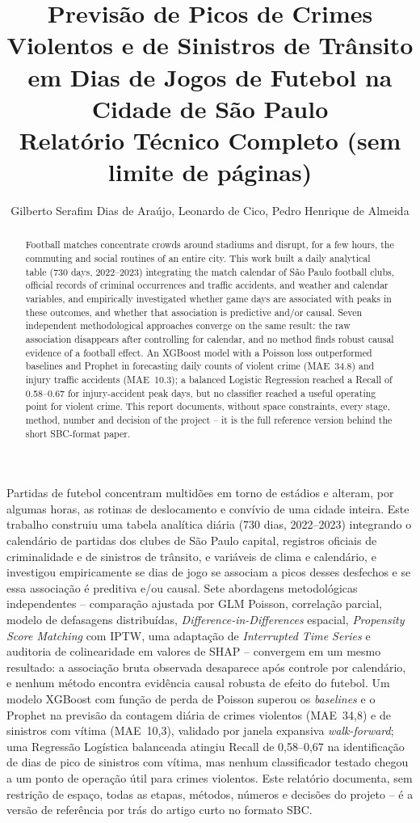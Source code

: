 \documentclass[12pt]{article}
\title{Previsão de Picos de Crimes Violentos e de Sinistros de Trânsito em
Dias de Jogos de Futebol na Cidade de São Paulo\\
\large Relatório Técnico Completo (sem limite de páginas)}
\author{Gilberto Serafim Dias de Araújo\inst{1}, Leonardo de Cico\inst{1},
Pedro Henrique de Almeida\inst{1}}
\begin{document}
\maketitle

\begin{resumo}
Partidas de futebol concentram multidões em torno de estádios e alteram,
por algumas horas, as rotinas de deslocamento e convívio de uma cidade
inteira. Este trabalho construiu uma tabela analítica diária (730 dias,
2022--2023) integrando o calendário de partidas dos clubes de São Paulo
capital, registros oficiais de criminalidade e de sinistros de trânsito, e
variáveis de clima e calendário, e investigou empiricamente se dias de
jogo se associam a picos desses desfechos e se essa associação é
preditiva e/ou causal. Sete abordagens metodológicas independentes --
comparação ajustada por GLM Poisson, correlação parcial, modelo de
defasagens distribuídas, \emph{Difference-in-Differences} espacial,
\emph{Propensity Score Matching} com IPTW, uma adaptação de
\emph{Interrupted Time Series} e auditoria de colinearidade em valores de
SHAP -- convergem em um mesmo resultado: a associação bruta observada
desaparece após controle por calendário, e nenhum método encontra
evidência causal robusta de efeito do futebol. Um modelo XGBoost com
função de perda de Poisson superou os \emph{baselines} e o Prophet na
previsão da contagem diária de crimes violentos (MAE~34,8) e de sinistros
com vítima (MAE~10,3), validado por janela expansiva \emph{walk-forward};
uma Regressão Logística balanceada atingiu Recall de 0,58--0,67 na
identificação de dias de pico de sinistros com vítima, mas nenhum
classificador testado chegou a um ponto de operação útil para crimes
violentos. Este relatório documenta, sem restrição de espaço, todas as
etapas, métodos, números e decisões do projeto -- é a versão de
referência por trás do artigo curto no formato SBC.
\end{resumo}

\begin{abstract}
Football matches concentrate crowds around stadiums and disrupt, for a
few hours, the commuting and social routines of an entire city. This work
built a daily analytical table (730 days, 2022--2023) integrating the
match calendar of São Paulo football clubs, official records of criminal
occurrences and traffic accidents, and weather and calendar variables,
and empirically investigated whether game days are associated with peaks
in these outcomes, and whether that association is predictive and/or
causal. Seven independent methodological approaches converge on the same
result: the raw association disappears after controlling for calendar,
and no method finds robust causal evidence of a football effect. An
XGBoost model with a Poisson loss outperformed baselines and Prophet in
forecasting daily counts of violent crime (MAE~34.8) and injury traffic
accidents (MAE~10.3); a balanced Logistic Regression reached a Recall of
0.58--0.67 for injury-accident peak days, but no classifier reached a
useful operating point for violent crime. This report documents, without
space constraints, every stage, method, number and decision of the
project -- it is the full reference version behind the short SBC-format
paper.
\end{abstract}
\end{document}
